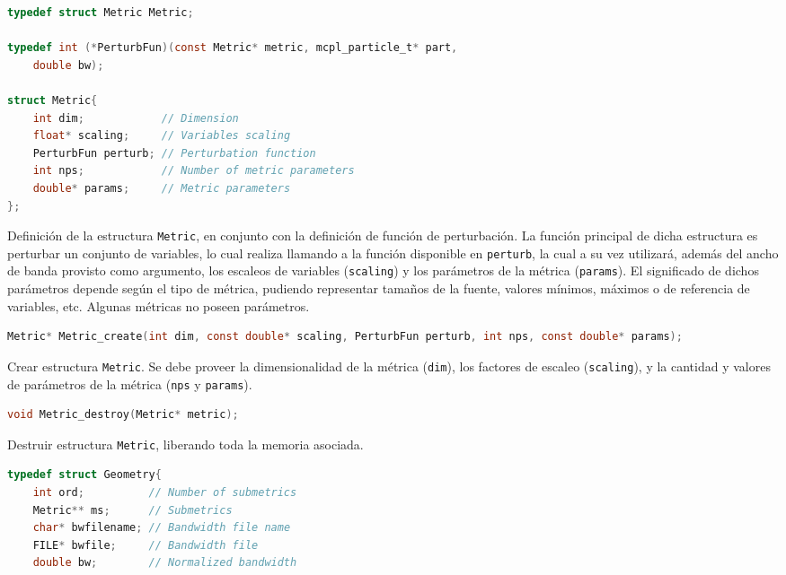 \begin{footnotesize}

\begin{lstlisting}[language=C]
typedef struct Metric Metric;

typedef int (*PerturbFun)(const Metric* metric, mcpl_particle_t* part,
	double bw);

struct Metric{
	int dim;            // Dimension
	float* scaling;     // Variables scaling
	PerturbFun perturb; // Perturbation function
	int nps;            // Number of metric parameters
	double* params;     // Metric parameters
};
\end{lstlisting}
\begin{addmargin}[0.5cm]{0cm}
Definición de la estructura \verb|Metric|, en conjunto con la definición de función de perturbación. La función principal de dicha estructura es perturbar un conjunto de variables, lo cual realiza llamando a la función disponible en \verb|perturb|, la cual a su vez utilizará, además del ancho de banda provisto como argumento, los escaleos de variables (\verb|scaling|) y los parámetros de la métrica (\verb|params|). El significado de dichos parámetros depende según el tipo de métrica, pudiendo representar tamaños de la fuente, valores mínimos, máximos o de referencia de variables, etc. Algunas métricas no poseen parámetros.
\end{addmargin}

\begin{lstlisting}[language=C]
Metric* Metric_create(int dim, const double* scaling, PerturbFun perturb, int nps, const double* params);
\end{lstlisting}
\begin{addmargin}[0.5cm]{0cm}
Crear estructura \verb|Metric|. Se debe proveer la dimensionalidad de la métrica (\verb|dim|), los factores de escaleo (\verb|scaling|), y la cantidad y valores de parámetros de la métrica (\verb|nps| y \verb|params|).
\end{addmargin}

\begin{lstlisting}[language=C]
void Metric_destroy(Metric* metric);
\end{lstlisting}
\begin{addmargin}[0.5cm]{0cm}
Destruir estructura \verb|Metric|, liberando toda la memoria asociada.
\end{addmargin}

\begin{lstlisting}[language=C]
typedef struct Geometry{
	int ord;          // Number of submetrics
	Metric** ms;      // Submetrics
	char* bwfilename; // Bandwidth file name
	FILE* bwfile;     // Bandwidth file
	double bw;        // Normalized bandwidth


\end{lstlisting}
\end{footnotesize}
